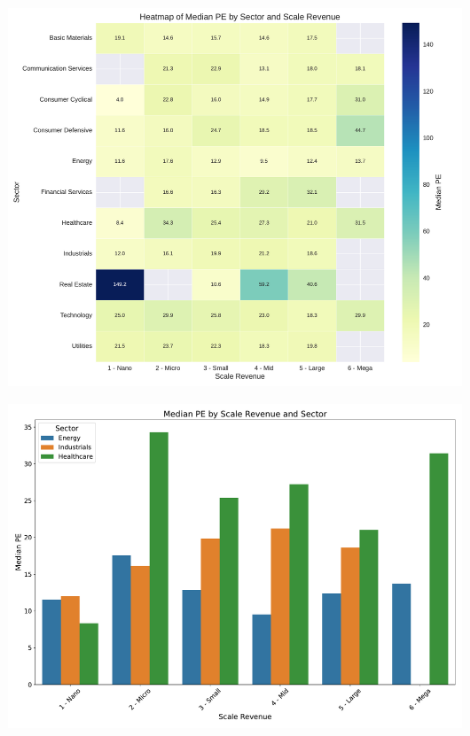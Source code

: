 \documentclass[10pt]{beamer}
\begin{document}
\begin{frame}[plain] 
  \begin{center}
  \includegraphics[width=0.9\textwidth]{financial_images/heatmap_pe.pdf}
  \end{center}
\end{frame}


\begin{frame}[plain]
  \begin{center}
  \includegraphics[width=0.9\textwidth]{financial_images/bar_chart_pe_updated.pdf}
  \end{center}
\end{frame} 
\end{document}
